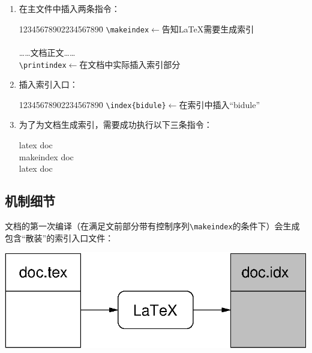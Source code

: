 \begin{enumerate}
    \item 在主文件中插入两条指令：
    \begin{dmd}
    \begin{tabbing}
12345678902234567890\=\kill
\verb|\makeindex|\>\textsf{$\leftarrow$告知\LaTeX 需要生成索引}\\
\verb||\\
{\rmfamily ……文档正文……}\\
\verb|\printindex|\>\textsf{$\leftarrow$在文档中实际插入索引部分}\\
\verb||
    \end{tabbing}
    \end{dmd}

    \item 插入索引入口：
\begin{dmd}
\begin{tabbing}
12345678902234567890\=\kill
\verb|\index{bidule}|\>\textsf{$\leftarrow$在索引中插入“bidule”}
\end{tabbing}
\end{dmd}

    \item 为了为文档生成索引，需要成功执行以下三条指令：
    
    \begin{dmd}
        latex doc\\makeindex doc\\latex doc
    \end{dmd}
\end{enumerate}

\subsection{机制细节}

文档的第一次编译（在满足文前部分带有控制序列\verb|\makeindex|的条件下）会生成包含“散装”的索引入口文件：

\begin{center}
    \includegraphics{img/makeindex1}
\end{center}

